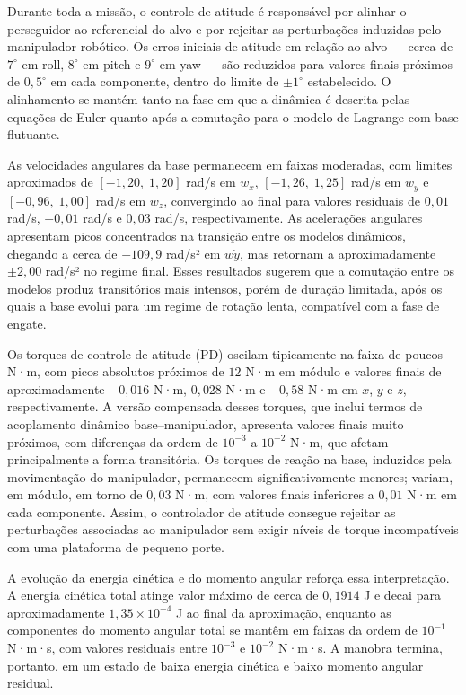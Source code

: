 Durante toda a missão, o controle de atitude é responsável por alinhar o perseguidor ao referencial do alvo e por rejeitar as perturbações induzidas pelo manipulador robótico. Os erros iniciais de atitude em relação ao alvo — cerca de $7^\circ$ em roll, $8^\circ$ em pitch e $9^\circ$ em yaw — são reduzidos para valores finais próximos de $0{,}5^\circ$ em cada componente, dentro do limite de $\pm 1^\circ$ estabelecido. O alinhamento se mantém tanto na fase em que a dinâmica é descrita pelas equações de Euler quanto após a comutação para o modelo de Lagrange com base flutuante.

As velocidades angulares da base permanecem em faixas moderadas, com limites aproximados de $[-1{,}20,\;1{,}20]$ rad/s em $w_x$, $[-1{,}26,\;1{,}25]$ rad/s em $w_y$ e $[-0{,}96,\;1{,}00]$ rad/s em $w_z$, convergindo ao final para valores residuais de $0{,}01$ rad/s, $-0{,}01$ rad/s e $0{,}03$ rad/s, respectivamente. As acelerações angulares apresentam picos concentrados na transição entre os modelos dinâmicos, chegando a cerca de $-109{,}9$ rad/s² em $w\dot{y}$, mas retornam a aproximadamente $\pm 2{,}00$ rad/s² no regime final. Esses resultados sugerem que a comutação entre os modelos produz transitórios mais intensos, porém de duração limitada, após os quais a base evolui para um regime de rotação lenta, compatível com a fase de engate.

Os torques de controle de atitude (PD) oscilam tipicamente na faixa de poucos N·m, com picos absolutos próximos de $12$ N·m em módulo e valores finais de aproximadamente $-0{,}016$ N·m, $0{,}028$ N·m e $-0{,}58$ N·m em $x$, $y$ e $z$, respectivamente.
A versão compensada desses torques, que inclui termos de acoplamento dinâmico base--manipulador, apresenta valores finais muito próximos, com diferenças da ordem de $10^{-3}$ a $10^{-2}$ N·m, que afetam principalmente a forma transitória. Os torques de reação na base, induzidos pela movimentação do manipulador, permanecem significativamente menores; variam, em módulo, em torno de $0{,}03$ N·m, com valores finais inferiores a $0{,}01$ N·m em cada componente. Assim, o controlador de atitude consegue rejeitar as perturbações associadas ao manipulador sem exigir níveis de torque incompatíveis com uma plataforma de pequeno porte.

A evolução da energia cinética e do momento angular reforça essa interpretação. A energia cinética total atinge valor máximo de cerca de $0{,}1914$ J e decai para aproximadamente $1{,}35\times 10^{-4}$ J ao final da aproximação, enquanto as componentes do momento angular total se mantêm em faixas da ordem de $10^{-1}$ N·m·s, com valores residuais entre $10^{-3}$ e $10^{-2}$ N·m·s. A manobra termina, portanto, em um estado de baixa energia cinética e baixo momento angular residual.

